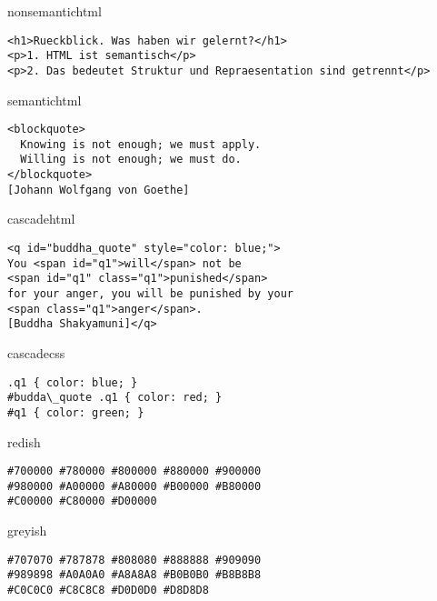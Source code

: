 \begin{chunk}{nonsemantichtml}
\begin{lstlisting}[frame=single,xleftmargin=5mm, numberstyle=\tiny]
<h1>Rueckblick. Was haben wir gelernt?</h1>
<p>1. HTML ist semantisch</p>
<p>2. Das bedeutet Struktur und Repraesentation sind getrennt</p>
\end{lstlisting}
\end{chunk}


\begin{chunk}{semantichtml}
\begin{lstlisting}[frame=single,xleftmargin=5mm, numberstyle=\tiny]
<blockquote>
  Knowing is not enough; we must apply.
  Willing is not enough; we must do.
</blockquote>
[Johann Wolfgang von Goethe]
\end{lstlisting}
\end{chunk}



\begin{chunk}{cascadehtml}
\begin{lstlisting}[frame=single,xleftmargin=5mm, numberstyle=\tiny]
<q id="buddha_quote" style="color: blue;">
You <span id="q1">will</span> not be
<span id="q1" class="q1">punished</span>
for your anger, you will be punished by your
<span class="q1">anger</span>.
[Buddha Shakyamuni]</q>
\end{lstlisting}
\end{chunk}

\begin{chunk}{cascadecss}
\begin{lstlisting}[frame=single,xleftmargin=5mm, numberstyle=\tiny]
.q1 { color: blue; }
#budda\_quote .q1 { color: red; }
#q1 { color: green; }
\end{lstlisting}
\end{chunk}



\begin{chunk}{redish}
\begin{lstlisting}[frame=single,xleftmargin=5mm, numberstyle=\tiny]
#700000 #780000 #800000 #880000 #900000
#980000 #A00000 #A80000 #B00000 #B80000
#C00000 #C80000 #D00000
\end{lstlisting}
\end{chunk}

\begin{chunk}{greyish}
\begin{lstlisting}[frame=single,xleftmargin=5mm, numberstyle=\tiny]
#707070 #787878 #808080 #888888 #909090
#989898 #A0A0A0 #A8A8A8 #B0B0B0 #B8B8B8
#C0C0C0 #C8C8C8 #D0D0D0 #D8D8D8
\end{lstlisting}
\end{chunk}

